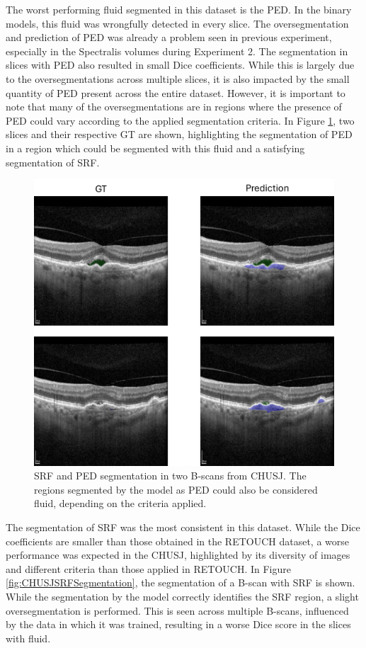 The worst performing fluid segmented in this dataset is the PED. In the binary models, this fluid was wrongfully detected in every slice. The oversegmentation and prediction of PED was already a problem seen in previous experiment, especially in the Spectralis volumes during Experiment 2. The segmentation in slices with PED also resulted in small Dice coefficients. While this is largely due to the oversegmentations across multiple slices, it is also impacted by the small quantity of PED present across the entire dataset. However, it is important to note that many of the oversegmentations are in regions where the presence of PED could vary according to the applied segmentation criteria. In Figure \ref{fig:CHUSJPEDSegmentation}, two slices and their respective GT are shown, highlighting the segmentation of PED in a region which could be segmented with this fluid and a satisfying segmentation of SRF.

\begin{figure}[!ht]
	\centering
	\includegraphics[width=0.9\linewidth]{figures/CHUSJPEDSegmentation.png}
	\caption{SRF and PED segmentation in two B-scans from CHUSJ. The regions segmented by the model as PED could also be considered fluid, depending on the criteria applied.}
	\label{fig:CHUSJPEDSegmentation}
\end{figure}

The segmentation of SRF was the most consistent in this dataset. While the Dice coefficients are smaller than those obtained in the RETOUCH dataset, a worse performance was expected in the CHUSJ, highlighted by its diversity of images and different criteria than those applied in RETOUCH. In Figure \ref{fig:CHUSJSRFSegmentation}, the segmentation of a B-scan with SRF is shown. While the segmentation by the model correctly identifies the SRF region, a slight oversegmentation is performed. This is seen across multiple B-scans, influenced by the data in which it was trained, resulting in a worse Dice score in the slices with fluid.

